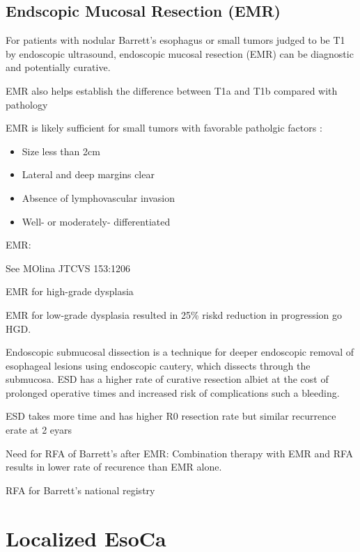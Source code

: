 \documentclass[
]{book}
\providecommand{\tightlist}{%
  \setlength{\itemsep}{0pt}\setlength{\parskip}{0pt}}
\begin{document}
\hypertarget{emr}{%
\section{Endscopic Mucosal Resection (EMR)}\label{emr}}

For patients with nodular Barrett's esophagus or small tumors judged to be T1 by endoscopic ultrasound, endoscopic mucosal resection (EMR) can be diagnostic and potentially curative.\citep{thomas1609}

EMR also helps establish the difference between T1a and T1b compared with pathology \citep{worrell484}

EMR is likely sufficient for small tumors with favorable patholgic factors\citep{pech652} \citep{nurkin1090}:

\begin{itemize}
\tightlist
\item
  Size less than 2cm
\item
  Lateral and deep margins clear
\item
  Absence of lymphovascular invasion
\item
  Well- or moderately- differentiated
\end{itemize}

EMR: \citep{soetikno4490}

See MOlina JTCVS 153:1206

EMR for high-grade dysplasia \citep{shaheen2277}

EMR for low-grade dysplasia \citep{phoa1209} resulted in 25\% riskd reduction in progression go HGD.

Endoscopic submucosal dissection is a technique for deeper endoscopic removal of esophageal lesions using endoscopic cautery, which dissects through the submucosa. ESD has a higher rate of curative resection \citep{cao751} albiet at the cost of prolonged operative times and increased risk of complications such a bleeding. \citep{repici715}

ESD takes more time and has higher R0 resection rate but similar recurrence erate at 2 eyars \citep{terheggen783}

Need for RFA of Barrett's after EMR: \citep{haidry87} Combination therapy with EMR and RFA results in lower rate of recurence than EMR alone.\citep{pech1200}

RFA for Barrett's national registry \citep{ganz35}

\hypertarget{localized}{%
\chapter{Localized EsoCa}\label{localized}}
\end{document}
